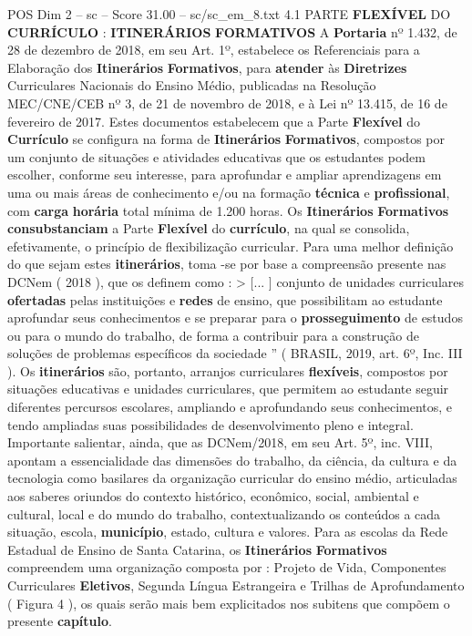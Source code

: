 \begin{textsample}{POS Dim 2 – sc – Score 31.00 – sc/sc\_em\_8.txt}  \label{ex:f2_pos_001}
4.1 PARTE \textbf{FLEXÍVEL} DO \textbf{CURRÍCULO} : \textbf{ITINERÁRIOS} \textbf{FORMATIVOS} A \textbf{Portaria} nº 1.432, de 28 de dezembro de 2018, em seu Art. 1º, estabelece os Referenciais para a Elaboração dos \textbf{Itinerários} \textbf{Formativos}, para \textbf{atender} às \textbf{Diretrizes} Curriculares Nacionais do Ensino Médio, publicadas na Resolução MEC/CNE/CEB nº 3, de 21 de novembro de 2018, e à Lei nº 13.415, de 16 de fevereiro de 2017.
Estes documentos estabelecem que a Parte \textbf{Flexível} do \textbf{Currículo} se configura na forma de \textbf{Itinerários} \textbf{Formativos}, compostos por um conjunto de situações e atividades educativas que os estudantes podem escolher, conforme seu interesse, para aprofundar e ampliar aprendizagens em uma ou mais áreas de conhecimento e/ou na formação \textbf{técnica} e \textbf{profissional}, com \textbf{carga} \textbf{horária} total mínima de 1.200 horas.
Os \textbf{Itinerários} \textbf{Formativos} \textbf{consubstanciam} a Parte \textbf{Flexível} do \textbf{currículo}, na qual se consolida, efetivamente, o princípio de flexibilização curricular.
Para uma melhor definição do que sejam estes \textbf{itinerários}, toma -se por base a compreensão presente nas DCNem ( 2018 ), que os definem como : > [... ] conjunto de unidades curriculares \textbf{ofertadas} pelas instituições e \textbf{redes} de ensino, que possibilitam ao estudante aprofundar seus conhecimentos e se preparar para o \textbf{prosseguimento} de estudos ou para o mundo do trabalho, de forma a contribuir para a construção de soluções de problemas específicos da sociedade ” ( BRASIL, 2019, art. 6º, Inc.
III ).
Os \textbf{itinerários} são, portanto, arranjos curriculares \textbf{flexíveis}, compostos por situações educativas e unidades curriculares, que permitem ao estudante seguir diferentes percursos escolares, ampliando e aprofundando seus conhecimentos, e tendo ampliadas suas possibilidades de desenvolvimento pleno e integral.
Importante salientar, ainda, que as DCNem/2018, em seu Art. 5º, inc.
VIII, apontam a essencialidade das dimensões do trabalho, da ciência, da cultura e da tecnologia como basilares da organização curricular do ensino médio, articuladas aos saberes oriundos do contexto histórico, econômico, social, ambiental e cultural, local e do mundo do trabalho, contextualizando os conteúdos a cada situação, escola, \textbf{município}, estado, cultura e valores.
Para as escolas da Rede Estadual de Ensino de Santa Catarina, os \textbf{Itinerários} \textbf{Formativos} compreendem uma organização composta por : Projeto de Vida, Componentes Curriculares \textbf{Eletivos}, Segunda Língua Estrangeira e Trilhas de Aprofundamento ( Figura 4 ), os quais serão mais bem explicitados nos subitens que compõem o presente \textbf{capítulo}.

\end{textsample}
